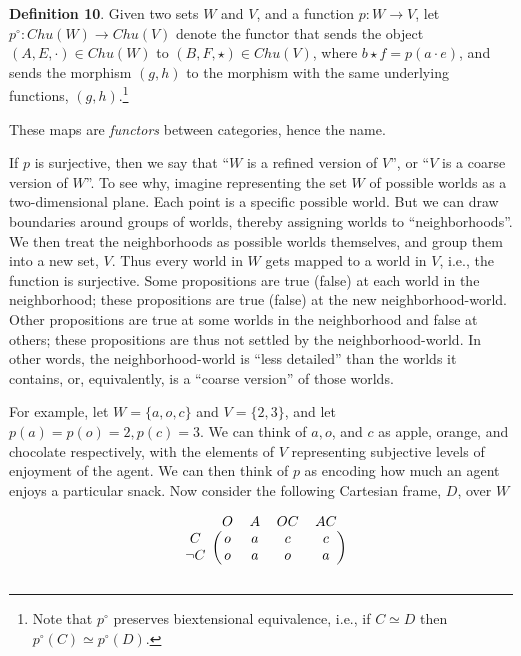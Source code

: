 \documentclass{article}
\begin{document}
\bigskip
\noindent \textbf{Definition 10}.
Given two sets $W$ and $V$, and a function $p: W \to V$, let $p^{\circ} : Chu(W) \to Chu(V)$ denote the functor that sends the object $(A, E, \cdot) \in Chu(W)$ to $(B, F, \star) \in Chu(V)$, where $b \star f = p(a \cdot e)$, and sends the morphism $(g, h)$ to the morphism with the same underlying functions, $(g, h)$.\footnote{Note that $p^{\circ}$ preserves biextensional equivalence, i.e., if $C \simeq D$ then $p^{\circ}(C) \simeq p^{\circ}(D)$.}

\bigskip
\noindent These maps are \emph{functors} between categories, hence the name.

If $p$ is surjective, then we say that ``$W$ is a refined version of $V$'', or ``$V$ is a coarse version of $W$''.
To see why, imagine representing the set $W$ of possible worlds as a two-dimensional plane.
Each point is a specific possible world.
But we can draw boundaries around groups of worlds, thereby assigning worlds to ``neighborhoods''.
We then treat the neighborhoods as possible worlds themselves, and group them into a new set, $V$.
Thus every world in $W$ gets mapped to a world in $V$, i.e., the function is surjective.
Some propositions are true (false) at each world in the neighborhood;
these propositions are true (false) at the new neighborhood-world.
Other propositions are true at some worlds in the neighborhood and false at others;
these propositions are thus not settled by the neighborhood-world.
In other words, the neighborhood-world is ``less detailed'' than the worlds it contains, or, equivalently, is a ``coarse version'' of those worlds.\footnotemark
{}


For example, let $W=\{a, o, c\}$ and $V=\{2, 3\}$, and let $p(a)=p(o)=2, p(c)=3$. We can think of $a, o$, and $c$ as apple, orange, and chocolate respectively, with the elements of $V$ representing subjective levels of enjoyment of the agent. We can then think of $p$ as encoding how much an agent enjoys a particular snack. Now consider the following Cartesian frame, $D$, over $W$

\bigskip
\[
\begin{blockarray}{ccccc}
& O & A & OC & AC\\
\begin{block}{c(cccc)}
C & o & a & c & c\\
\neg C & o & a & o & a\\
\end{block}
\end{blockarray}
\]
\end{document}
